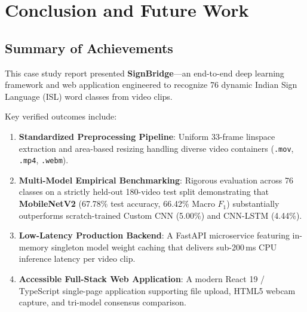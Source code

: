 \chapter{Conclusion and Future Work}
\label{ch:conclusion}

\section{Summary of Achievements}
\label{sec:conclusion_summary}
This case study report presented \textbf{SignBridge}---an end-to-end deep learning framework and web application engineered to recognize 76 dynamic Indian Sign Language (ISL) word classes from video clips. 

Key verified outcomes include:
\begin{enumerate}
    \item \textbf{Standardized Preprocessing Pipeline}: Uniform 33-frame linspace extraction and area-based resizing handling diverse video containers (\texttt{.mov}, \texttt{.mp4}, \texttt{.webm}).
    \item \textbf{Multi-Model Empirical Benchmarking}: Rigorous evaluation across 76 classes on a strictly held-out 180-video test split demonstrating that \textbf{MobileNetV2} (67.78\% test accuracy, 66.42\% Macro $F_1$) substantially outperforms scratch-trained Custom CNN (5.00\%) and CNN-LSTM (4.44\%).
    \item \textbf{Low-Latency Production Backend}: A FastAPI microservice featuring in-memory singleton model weight caching that delivers sub-200\,ms CPU inference latency per video clip.
    \item \textbf{Accessible Full-Stack Web Application}: A modern React 19 / TypeScript single-page application supporting file upload, HTML5 webcam capture, and tri-model consensus comparison.
\end{enumerate}

